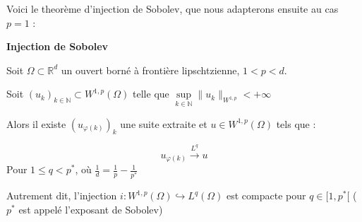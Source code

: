Voici le theorème d'injection de Sobolev, que nous adapterons ensuite au cas $p = 1$ : 

\begin{theorembox}
\begin{theorem}
    \textbf{Injection de Sobolev}
    
    Soit $\Omega \subset \mathbb{R}^d$ un ouvert borné à frontière lipschtzienne, $1 < p < d$.

    \vspace{1em}
    
    Soit $(u_k)_{k \in \mathbb{N}} \subset W^{1,p}(\Omega)$ telle que $\underset{k \in \mathbb{N}}{\sup} \|u_k\|_{W^{1,p}} < +\infty$
    
    Alors il existe $(u_{\varphi(k)})_k$ une suite extraite et $u \in W^{1,p}(\Omega)$ tels que :

    $$u_{\varphi(k)} \xrightarrow{L^q} u$$
    Pour $1 \leq q < p^*$, où $\frac{1}{d} = \frac{1}{p} - \frac{1}{p^*}$

    \vspace{1em}

    Autrement dit, l'injection $i : W^{1,p}(\Omega) \hookrightarrow L^q(\Omega)$ est compacte pour $q \in [1,p^*[$ ($p^*$ est appelé l'exposant de Sobolev)
\end{theorem}
\end{theorembox}

